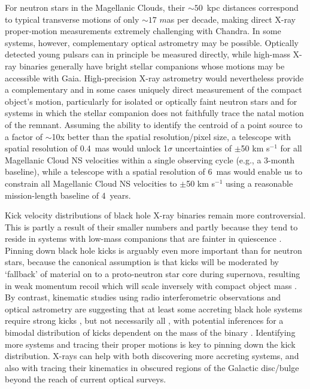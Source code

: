 \documentclass{article}
\begin{document}
For neutron stars in the Magellanic Clouds, their $\sim50$~kpc distances correspond to typical transverse motions of only $\sim17$ $m$as per decade, making direct X-ray proper-motion measurements extremely challenging with Chandra. In some systems, however, complementary optical astrometry may be possible. Optically detected young pulsars can in principle be measured directly, while high-mass X-ray binaries generally have bright stellar companions whose motions may be accessible with Gaia. High-precision X-ray astrometry would nevertheless provide a complementary and in some cases uniquely direct measurement of the compact object's motion, particularly for isolated or optically faint neutron stars and for systems in which the stellar companion does not faithfully trace the natal motion of the remnant. Assuming the ability to identify the centroid of a point source to a factor of $\sim$10x better than the spatial resolution/pixel size, a telescope with spatial resolution of 0.4~mas would unlock 1$\sigma$ uncertainties of $\pm$50 km s$^{-1}$ for all Magellanic Cloud NS velocities within a single observing cycle (e.g., a 3-month baseline), while a telescope with a spatial resolution of 6~mas would enable us to constrain all Magellanic Cloud NS velocities to $\pm$50 km s$^{-1}$ using a reasonable mission-length baseline of 4~years.

Kick velocity distributions of black hole X-ray binaries remain more controversial. This is partly a result of their smaller numbers and partly because they tend to reside in systems with low-mass companions that are fainter in quiescence \cite{Casares2014, CorralSantana2016, Tetarenko2016, Gandhi2019, Fortin2024}. Pinning down black hole kicks is arguably even more important than for neutron stars, because the canonical assumption is that kicks will be moderated by `fallback' of material on to a proto-neutron star core during supernova, resulting in weak momentum recoil which will scale inversely with compact object mass \cite{Fryer2012}. By contrast, kinematic studies using radio interferometric observations and optical astrometry are suggesting that at least some accreting black hole systems require strong kicks \cite{Mirabel2002, Willems2005, Gandhi2019, 2019MNRAS.489.3116A, Kimball2023, dashwoodbrown24}, but not necessarily all \cite{Burdge2024, Nagarajan2025}, with potential inferences for a bimodal distribution of kicks dependent on the mass of the binary \cite{zhao23}. Identifying more systems and tracing their proper motions is key to pinning down the kick distribution. X-rays can help with both discovering more accreting systems, and also with tracing their kinematics in obscured regions of the Galactic disc/bulge beyond the reach of current optical surveys. 
\end{document}
